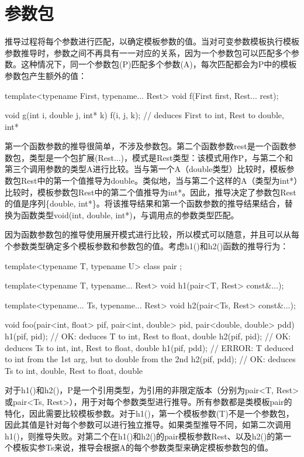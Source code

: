 \section{参数包}

推导过程将每个参数进行匹配，以确定模板参数的值。当对可变参数模板执行模板参数推导时，参数之间不再具有一一对应的关系，因为一个参数包可以匹配多个参数。这种情况下，同一个参数包(P)匹配多个参数(A)，每次匹配都会为P中的模板参数包产生额外的值：

\begin{cpp}
template<typename First, typename... Rest>
void f(First first, Rest... rest);

void g(int i, double j, int* k) {
	f(i, j, k); // deduces First to int, Rest to {double, int*}
}
\end{cpp}

第一个函数参数的推导很简单，不涉及参数包。第二个函数参数rest是一个函数参数包，类型是一个包扩展(Rest...)，模式是Rest类型：该模式用作P，与第二个和第三个调用参数的类型A进行比较。当与第一个A（double类型）比较时，模板参数包Rest中的第一个值推导为double。类似地，当与第二个这样的A（类型为int*）比较时，模板参数包Rest中的第二个值推导为int*。因此，推导决定了参数包Rest的值是序列\{double, int*\}。将该推导结果和第一个函数参数的推导结果结合，替换为函数类型void(int, double, int*)，与调用点的参数类型匹配。

因为函数参数包的推导使用展开模式进行比较，所以模式可以随意，并且可以从每个参数类型确定多个模板参数和参数包的值。考虑h1()和h2()函数的推导行为：

\begin{cpp}
template<typename T, typename U> class pair { };

template<typename T, typename... Rest>
	void h1(pair<T, Rest> const&...);

template<typename... Ts, typename... Rest>
	void h2(pair<Ts, Rest> const&...);

void foo(pair<int, float> pif, pair<int, double> pid,
pair<double, double> pdd) {
	h1(pif, pid); // OK: deduces T to int, Rest to {float, double}
	h2(pif, pid); // OK: deduces Ts to {int, int}, Rest to {float, double}
	h1(pif, pdd); // ERROR: T deduced to int from the 1st arg, but to double from the 2nd
	h2(pif, pdd); // OK: deduces Ts to {int, double}, Rest to {float, double}
}
\end{cpp}

对于h1()和h2()，P是一个引用类型，为引用的非限定版本（分别为pair<T, Rest>或pair<Ts, Rest>），用于对每个参数类型进行推导。所有参数都是类模板pair的特化，因此需要比较模板参数。对于h1()，第一个模板参数(T)不是一个参数包，因此其值是针对每个参数可以进行独立推导。如果类型推导不同，如第二次调用h1()，则推导失败。对第二个在h1()和h2()的pair模板参数Rest、以及h2()的第一个模板实参Ts来说，推导会根据A的每个参数类型来确定模板参数包的值。

